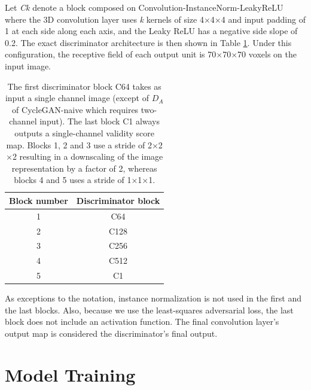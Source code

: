 Let \textit{Ck} denote a block composed on Convolution-InstanceNorm-LeakyReLU where the 3D convolution layer uses \textit{k} kernels of size 4$\times$4$\times$4 and input padding of 1 at each side along each axis, and the Leaky ReLU has a negative side slope of 0.2. The exact discriminator architecture is then shown in Table \ref{tab:discriminator_architecture}. Under this configuration, the receptive field of each output unit is 70$\times$70$\times$70 voxels on the input image.

\begin{table}[h!]
    \centering
    \begin{tabular}{cc}
        \hline
        \textbf{Block number} & \textbf{Discriminator block}\\
        \hline
        1     & C64       \\
        2     & C128      \\
        3     & C256      \\
        4     & C512      \\
        5     & C1        \\
        \hline
    \end{tabular}
    \caption{The first discriminator block C64 takes as input a single channel image (except of $D_A$ of CycleGAN-naive which requires two-channel input). The last block C1 always outputs a single-channel validity score map. Blocks 1, 2 and 3 use a stride of 2$\times$2$\times$2 resulting in a downscaling of the image representation by a factor of 2, whereas blocks 4 and 5 uses a stride of 1$\times$1$\times$1.}
    \label{tab:discriminator_architecture}
\end{table}
As exceptions to the notation, instance normalization is not used in the first and the last blocks. Also, because we use the least-squares adversarial loss, the last block does not include an activation function. The final convolution layer's output map is considered the discriminator's final output.



\section{Model Training}


